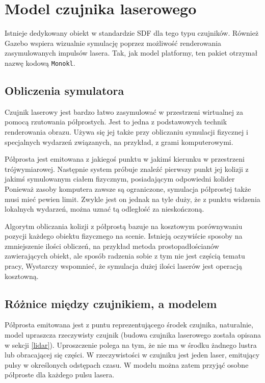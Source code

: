 \chapter{Model czujnika laserowego}
Istnieje dedykowany obiekt w standardzie SDF dla tego typu czujników.
Również Gazebo wspiera wizualnie symulację poprzez możliwość renderowania zasymulowanych impulsów lasera.
Tak, jak model platformy, ten pakiet otrzymał nazwę kodową \texttt{Monokl}.

\section{Obliczenia symulatora}
Czujnik laserowy jest bardzo łatwo zasymulować w przestrzeni wirtualnej za pomocą rzutowania półprostych.
Jest to jedna z podstawowych technik renderowania obrazu.
Używa się jej także przy obliczaniu symulacji fizycznej i specjalnych wydarzeń związanych, na przykład, z grami komputerowymi.

Półprosta jest emitowana z jakiegoś punktu w jakimś kierunku w przestrzeni trójwymiarowej.
Następnie system próbuje znaleźć pierwszy punkt jej kolizji z jakimś symulowanym ciałem fizycznym, posiadającym odpowiedni kolider 
Ponieważ zasoby komputera zawsze są ograniczone, symulacja półprostej także musi mieć pewien limit. 
Zwykle jest on jednak na tyle duży, że z punktu widzenia lokalnych wydarzeń, można uznać tą odległość za nieskończoną.

Algorytm obliczania kolizji z półprostą bazuje na kosztowym porównywaniu pozycji każdego obiektu fizycznego na scenie.
Istnieją oczywiście sposoby na zmniejszenie ilości obliczeń, na przykład metoda prostopadłościanów zawierających obiekt, ale sposób radzenia sobie z tym nie jest
częścią tematu pracy,
Wystarczy wspomnieć, że symulacja dużej ilości laserów jest operacją kosztowną.

\section{Różnice między czujnikiem, a modelem}
Półprosta emitowana jest z puntu reprezentującego środek czujnika, naturalnie, model upraszcza rzeczywisty czujnik (budowa czujnika laserowego została opisana w sekcji \ref{lidar}).
Uproszczenie polega na tym, że nie ma w środku żadnego lustra lub obracającej się części. 
W rzeczywistości w czujniku jest jeden laser, emitujący pulsy w określonych odstępach czasu.
W modelu można zatem przyjąć osobne półproste dla każdego pulsu lasera.

